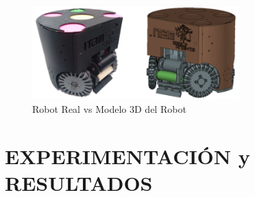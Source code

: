 \documentclass[twocolumn,10pt]{amrob}
\begin{document}
\begin{figure}
  \centering
    \includegraphics[width=8cm]{realVS3D.png}
  \caption{Robot Real vs Modelo 3D del Robot}
  \label{fig:ModRealVSdes}
\end{figure}

\section*{EXPERIMENTACIÓN y RESULTADOS}
\end{document}
